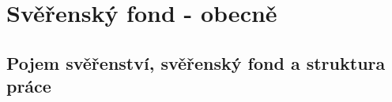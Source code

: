 \documentclass{article}
\begin{document}




\newpage

\section{Svěřenský fond - obecně}

\subsection{Pojem svěřenství, svěřenský fond a struktura práce}
\end{document}
